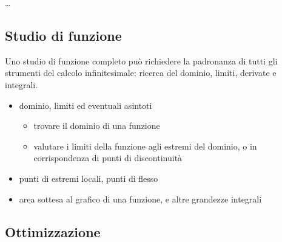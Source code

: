 \documentclass[letterpaper,10pt,italian]{jupyterBook}
\begin{document}
\sphinxAtStartPar
…


\subsection{Studio di funzione}
\label{\detokenize{ch/infinitesimal_calculus/derivatives:studio-di-funzione}}\label{\detokenize{ch/infinitesimal_calculus/derivatives:infinitesimal-calculus-derivatives-applications-fun}}
\sphinxAtStartPar
Uno studio di funzione completo può richiedere la padronanza di tutti gli strumenti del calcolo infinitesimale: ricerca del dominio, limiti, derivate e integrali.
\begin{itemize}
\item {} 
\sphinxAtStartPar
{\hyperref[\detokenize{ch/infinitesimal_calculus/analysis:infinitesimal-calculus-analysis-applications-fun}]{}} \sphinxhyphen{} dominio, limiti ed eventuali asintoti
\begin{itemize}
\item {} 
\sphinxAtStartPar
trovare il dominio di una funzione

\item {} 
\sphinxAtStartPar
valutare i limiti della funzione agli estremi del dominio, o in corrispondenza di punti di discontinuità

\end{itemize}

\item {} 
\sphinxAtStartPar
{\hyperref[\detokenize{ch/infinitesimal_calculus/derivatives:infinitesimal-calculus-derivatives-applications-fun}]{}} \sphinxhyphen{} punti di estremi locali, punti di flesso

\item {} 
\sphinxAtStartPar
{\hyperref[\detokenize{ch/infinitesimal_calculus/integrals:infinitesimal-calculus-integrals-applications-fun}]{}} \sphinxhyphen{} area sottesa al grafico di una funzione, e altre grandezze integrali

\end{itemize}


\subsection{Ottimizzazione}
\label{\detokenize{ch/infinitesimal_calculus/derivatives:ottimizzazione}}\label{\detokenize{ch/infinitesimal_calculus/derivatives:infinitesimal-calculus-derivatives-applications-optimization}}
\end{document}
